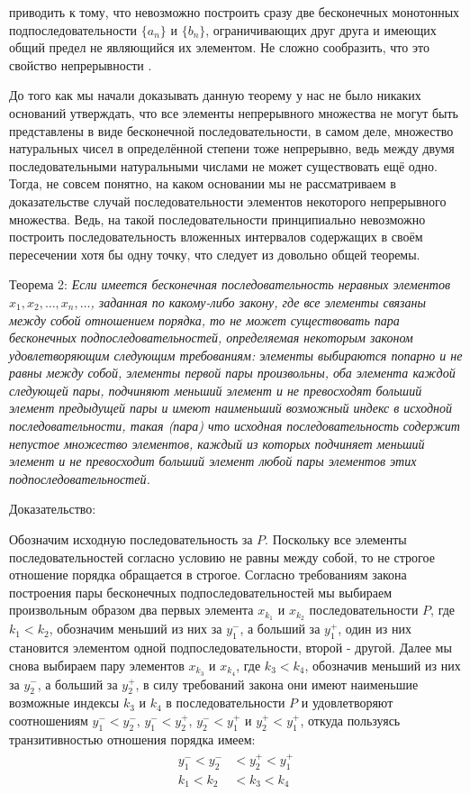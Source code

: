 \documentclass[12pt]{article}
\begin{document}
приводить к тому, что невозможно построить сразу две бесконечных монотонных подпоследовательности $\{a_n\}$ и $\{b_n\}$, ограничивающих друг друга и имеющих общий предел не являющийся их элементом. Не сложно сообразить, что это свойство непрерывности \cite{matan-completeness}.

До того как мы начали доказывать данную теорему у нас не было никаких оснований утверждать, что все элементы непрерывного множества не могут быть представлены в виде бесконечной последовательности, в самом деле, множество натуральных чисел в определённой степени тоже непрерывно, ведь между двумя последовательными натуральными числами не может существовать ещё одно. Тогда, не совсем понятно, на каком основании мы не рассматриваем в доказательстве случай последовательности элементов некоторого непрерывного множества. Ведь, на такой последовательности принципиально невозможно построить последовательность вложенных интервалов содержащих в своём пересечении хотя бы одну точку, что следует из довольно общей теоремы.

Теорема 2: {\sl Если имеется бесконечная последовательность неравных элементов $x_1, x_2, \dots, x_n, \dots$, заданная по какому-либо закону, где все элементы связаны между собой отношением порядка, то не может существовать пара бесконечных подпоследовательностей, определяемая некоторым законом удовлетворяющим следующим требованиям: элементы выбираются попарно и не равны между собой, элементы первой пары произвольны, оба элемента каждой следующей пары, подчиняют меньший элемент и не превосходят больший элемент предыдущей пары и имеют наименьший возможный индекс в исходной последовательности, такая (пара) что исходная последовательность содержит непустое множество элементов, каждый из которых подчиняет меньший элемент и не превосходит больший элемент любой пары элементов этих подпоследовательностей.}

Доказательство:

Обозначим исходную последовательность за $P$. Поскольку все элементы последовательностей согласно условию не равны между собой, то не строгое отношение порядка обращается в строгое. Согласно требованиям закона построения пары бесконечных подпоследовательностей мы выбираем произвольным образом два первых элемента $x_{k_1}$ и $x_{k_2}$ последовательности $P$, где $k_1 < k_2$, обозначим меньший из них за $y_1^-$, а больший за $y_1^+$, один из них становится элементом одной подпоследовательности, второй - другой. Далее мы снова выбираем пару элементов $x_{k_3}$ и $x_{k_4}$, где $k_3 < k_4$, обозначив меньший из них за $y_2^-$, а больший за $y_2^+$, в силу требований закона они имеют наименьшие возможные индексы $k_3$ и $k_4$ в последовательности $P$ и удовлетворяют соотношениям $y_1^- < y_2^-$, $y_1^- < y_2^+$, $y_2^- < y_1^+$ и $y_2^+ < y_1^+$, откуда пользуясь транзитивностью отношения порядка имеем:
\begin{align}
\begin{split}
y_1^- < y_2^- &< y_2^+< y_1^+\\
k_1 < k_2 &< k_3 < k_4
\end{split}
\end{align}
\end{document}
